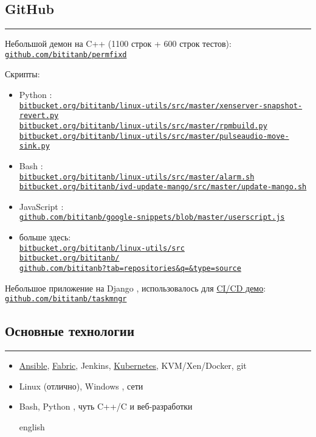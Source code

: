 \documentclass[11pt, a4paper]{article}
\newcommand{\Delimitline}{
  {\rule{\linewidth}{0.13ex}}
}
\newcommand\rurl[1]{%
  \href{http://#1}{\nolinkurl{#1}}%
}
\newcommand\Eng[1]{%
  \foreignlanguage{english}{#1}%
}
\begin{document}

\subsection*{{GitHub}}
\Delimitline

Небольшой демон на \Eng{C++} (1100 строк + 600 строк тестов):\\
  \rurl{github.com/bititanb/permfixd}
  
Скрипты:
\begin{itemize}
  \item \Eng{Python}:\\
    \rurl{bitbucket.org/bititanb/linux-utils/src/master/xenserver-snapshot-revert.py}\\
    \rurl{bitbucket.org/bititanb/linux-utils/src/master/rpmbuild.py}\\
    \rurl{bitbucket.org/bititanb/linux-utils/src/master/pulseaudio-move-sink.py}
  \item \Eng{Bash}:\\
    \rurl{bitbucket.org/bititanb/linux-utils/src/master/alarm.sh}\\
    \rurl{bitbucket.org/bititanb/ivd-update-mango/src/master/update-mango.sh}
  \item \Eng{JavaScript}:\\
    \rurl{github.com/bititanb/google-snippets/blob/master/userscript.js}
  \item больше здесь:\\
    \rurl{bitbucket.org/bititanb/linux-utils/src}\\
    \rurl{bitbucket.org/bititanb/}\\
    \rurl{github.com/bititanb?tab=repositories&q=&type=source}
\end{itemize}
Небольшое приложение на \Eng{Django}, использовалось для \href{https://github.com/bititanb/CI-CD-pipeline}{\Eng{CI/CD} демо}:\\
  \rurl{github.com/bititanb/taskmngr}

\subsection*{{Основные технологии}}
\Delimitline
\begin{itemize}
  \item \href{https://github.com/bititanb/ansible-taskmngr}{Ansible}, \href{https://bitbucket.org/bititanb/ivd-fabric/src}{Fabric}, Jenkins, \href{https://github.com/bititanb/ansible-taskmngr/tree/master/roles/taskmngr-kubernetes/templates}{Kubernetes}, KVM/Xen/Docker, git
  \item \Eng{Linux} (отлично), \Eng{Windows}, сети
  \item \Eng{Bash, Python}, чуть \Eng{C++/C} и веб-разработки
  \begin{otherlanguage*}{english}
  \end{otherlanguage*}
\end{itemize}
\end{document}
